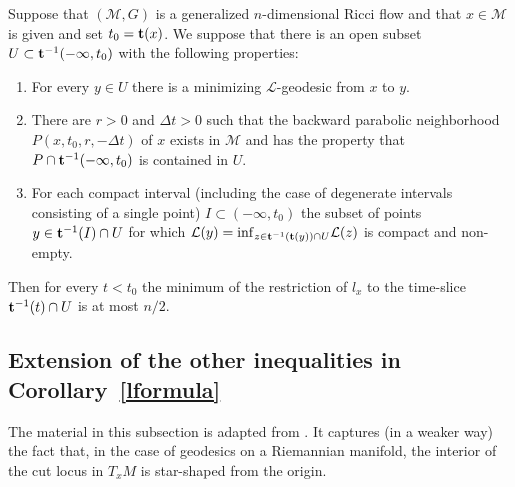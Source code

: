 \begin{corollary}
\label{cor:generalized-flow-n-half-bound}
\label{compactcoro}
Suppose that $({\mathcal M},G)$ is a generalized $n$-dimensional Ricci flow and
that $x\in {\mathcal M}$ is given and set $t_0={\bf t}(x)$. We suppose that
there is an open subset $U\subset {\bf t}^{-1}(-\infty,t_0)$ with the following
properties:
\begin{enumerate}
\item For every $y\in U$ there is a minimizing ${\mathcal L}$-geodesic from $x$
to $y$.
\item There are $r>0$ and $\Delta t>0$ such that the backward parabolic neighborhood
$P(x,t_0,r,-\Delta t)$ of $x$ exists in ${\mathcal M}$ and has  the property
that $P\cap {\bf t}^{-1}(-\infty,t_0)$ is contained in $U$.
\item For each compact interval (including the case of degenerate intervals
consisting of a single point) $I\subset (-\infty,t_0)$ the subset of points
$y\in {\bf t}^{-1}(I)\cap U$ for which ${\mathcal L}(y)=\mathrm{inf}_{z\in {\bf
t}^{-1}({\bf t}(y))\cap U}{\mathcal L}(z)$ is compact and non-empty.
\end{enumerate}
 Then
for every $t<t_0$ the minimum of the restriction of $l_x$ to the time-slice
${\bf t}^{-1}(t)\cap U$ is at most $n/2$.
\end{corollary}





\subsection{Extension of the other inequalities in
 Corollary~{\ref{lformula}}}

The material in this subsection is adapted from \cite{Ye}. It
captures (in a weaker way) the fact that, in the case of geodesics
on a Riemannian manifold, the interior of the cut locus in $T_xM$ is
star-shaped from the origin.


